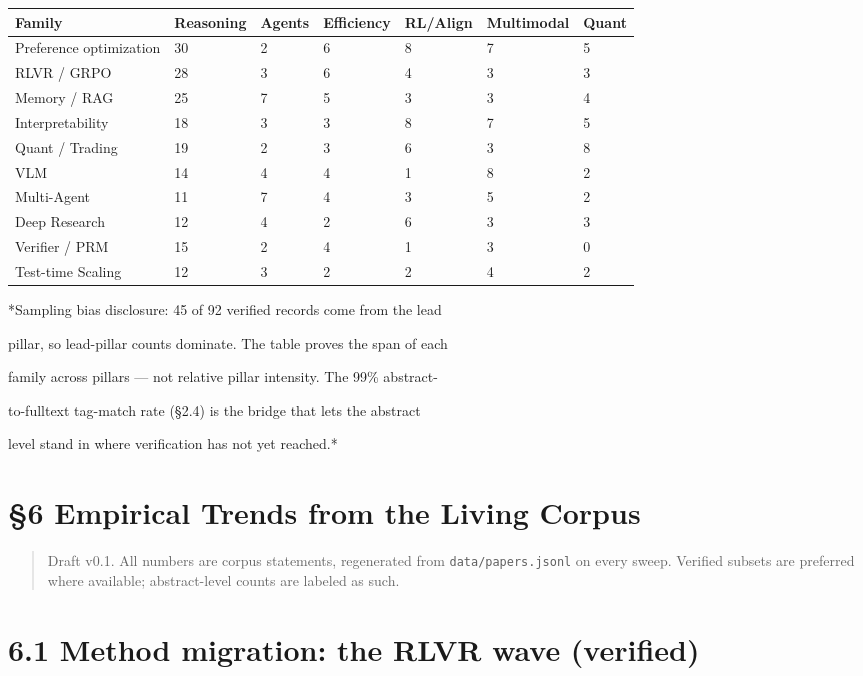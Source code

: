 \documentclass[11pt]{article}
\begin{document}
\begin{table}[h]\centering\begin{tabular}{lllllll}
\hline
Family & Reasoning & Agents & Efficiency & RL/Align & Multimodal & Quant \\
\hline
Preference optimization & 30 & 2 & 6 & 8 & 7 & 5 \\
RLVR / GRPO & 28 & 3 & 6 & 4 & 3 & 3 \\
Memory / RAG & 25 & 7 & 5 & 3 & 3 & 4 \\
Interpretability & 18 & 3 & 3 & 8 & 7 & 5 \\
Quant / Trading & 19 & 2 & 3 & 6 & 3 & 8 \\
VLM & 14 & 4 & 4 & 1 & 8 & 2 \\
Multi-Agent & 11 & 7 & 4 & 3 & 5 & 2 \\
Deep Research & 12 & 4 & 2 & 6 & 3 & 3 \\
Verifier / PRM & 15 & 2 & 4 & 1 & 3 & 0 \\
Test-time Scaling & 12 & 3 & 2 & 2 & 4 & 2 \\
\hline\end{tabular}\end{table}


*Sampling bias disclosure: 45 of 92 verified records come from the lead

pillar, so lead-pillar counts dominate. The table proves the span of each

family across pillars --- not relative pillar intensity. The 99\% abstract-

to-fulltext tag-match rate (\S2.4) is the bridge that lets the abstract

level stand in where verification has not yet reached.*



\section*{\S6 Empirical Trends from the Living Corpus}

\begin{quote}Draft v0.1. All numbers are corpus statements, regenerated from \texttt{data/papers.jsonl} on every sweep. Verified subsets are preferred where available; abstract-level counts are labeled as such.\end{quote}

\section{6.1 Method migration: the RLVR wave (verified)}
\end{document}
